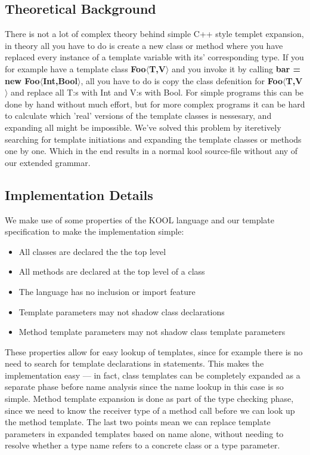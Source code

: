 \subsection{Theoretical Background}
There is not a lot of complex theory behind simple C++ style templet expansion,
in theory all you have to do is create a new class or method where you have
replaced every instance of a template variable with its' corresponding type.
If you for example have a template class \textbf{Foo$\langle$T,V$\rangle$} and you
invoke it by calling \textbf{bar = new Foo$\langle$Int,Bool$\rangle$}, all you have to
do is copy the class defenition for \textbf{Foo$\langle$T,V$\rangle$} and replace all
T:s with Int and V:s with Bool. For simple programs this can be done by hand
without much effort, but for more complex programs it can be hard to calculate
which 'real' versions of the template classes is nessesary, and expanding all
might be impossible. We've solved this problem by iteretively searching for
template initiations and expanding the template classes or methods one by one.
Which in the end results in a normal kool source-file without any of our
extended grammar.

\subsection{Implementation Details}

We make use of some properties of the KOOL language and our template specification to make the
implementation simple:

\begin{itemize}
    \item All classes are declared the the top level
    \item All methods are declared at the top level of a class
    \item The language has no inclusion or import feature
    \item Template parameters may not shadow class declarations
    \item Method template parameters may not shadow class template parameters
\end{itemize}

These properties allow for easy lookup of templates, since for example there is no need to search
for template declarations in statements. This makes the implementation easy --- in fact, class
templates can be completely expanded as a separate phase before name analysis since the name lookup
in this case is so simple. Method template expansion is done as part of the type checking phase,
since we need to know the receiver type of a method call before we can look up the method template.
The last two points mean we can replace template parameters in expanded templates based on name
alone, without needing to resolve whether a type name refers to a concrete class or a type
parameter.

